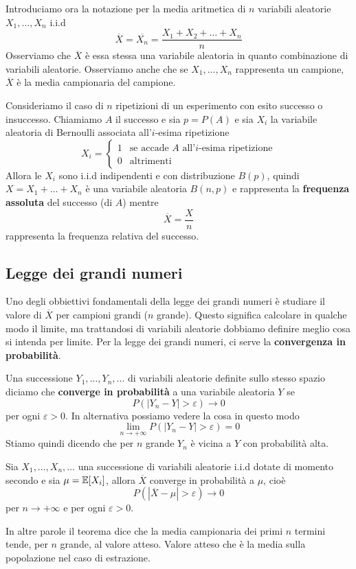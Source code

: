 Introduciamo ora la notazione per la media aritmetica di $n$ variabili aleatorie $X_1, \dots, X_n$
i.i.d
\[ \overline{X} = \overline{X_n} = \frac{X_1 + X_2 + \dots + X_n}{n} \]
Osserviamo che $\overline{X}$ è essa stessa una variabile aleatoria in quanto combinazione di
variabili aleatorie. Osserviamo anche che se $X_1, \dots, X_n$ rappresenta un campione,
$\overline{X}$ è la media campionaria del campione.

\begin{example}
	Consideriamo il caso di $n$ ripetizioni di un esperimento con esito successo o insuccesso.
	Chiamiamo $A$ il successo e sia $p = P(A)$ e sia $X_i$ la variabile aleatoria di Bernoulli
	associata all'$i$-esima ripetizione
	\[
		X_i = \begin{cases}
			1 & \text{se accade $A$ all'$i$-esima ripetizione} \\
			0 & \text{altrimenti}
		\end{cases}
	\]
	Allora le $X_i$ sono i.i.d indipendenti e con distribuzione $B(p)$, quindi $X=X_1+\dots+X_n$ è
	una variabile aleatoria $B(n,p)$ e rappresenta la \textbf{frequenza assoluta} del successo
	(di $A$) mentre
	\[ \overline{X} = \frac{X}{n} \]
	rappresenta la frequenza relativa del successo.
\end{example}

\subsection{Legge dei grandi numeri}
Uno degli obbiettivi fondamentali della legge dei grandi numeri è studiare il valore di
$\overline{X}$ per campioni grandi ($n$ grande). Questo significa calcolare in qualche modo il
limite, ma trattandosi di variabili aleatorie dobbiamo definire meglio cosa si intenda per limite.
Per la legge dei grandi numeri, ci serve la \textbf{convergenza in probabilità}.

\begin{definition}
	Una successione $Y_1, \dots, Y_n, \dots$ di variabili aleatorie definite sullo stesso spazio
	diciamo che \textbf{converge in probabilità} a una variabile aleatoria $Y$ se
	\[ P(|Y_n - Y| > \varepsilon) \to 0 \]
	per ogni $\varepsilon > 0$. In alternativa possiamo vedere la cosa in questo modo
	\[ \lim_{n \to +\infty} P(|Y_n - Y| > \varepsilon) = 0 \]
	Stiamo quindi dicendo che per $n$ grande $Y_n$ è vicina a $Y$ con probabilità alta.
\end{definition}

\begin{theorem}
	Sia $X_1, \dots, X_n, \dots$ una successione di variabili aleatorie i.i.d dotate di momento
	secondo e sia $\mu = \mathbb{E}[X_i]$, allora $\overline{X}$ converge in probabilità a $\mu$, cioè
	\[ P(|\overline{X} - \mu| > \varepsilon) \to 0 \]
	per $n \to +\infty$ e per ogni $\varepsilon > 0$.
\end{theorem}

In altre parole il teorema dice che la media campionaria dei primi $n$ termini tende, per $n$
grande, al valore atteso. Valore atteso che è la media sulla popolazione nel caso di estrazione.
